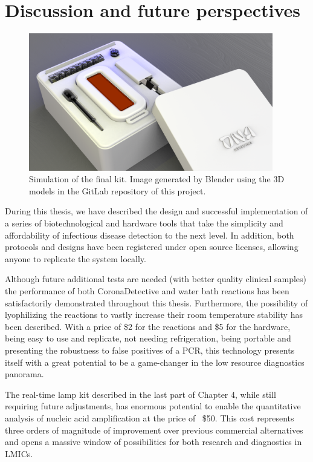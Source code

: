 
\chapter{Discussion and future perspectives}

\begin{figure}[b]
    \centering
    \includegraphics[width=0.95\textwidth]{figures/kit simulation.png}
    \caption{Simulation of the final kit. Image generated by Blender using the 3D models in the GitLab repository of this project\cite{francisco_javier_quero_lombardero_open_2021}.}
    \label{Final kit}
\end{figure}

During this thesis, we have described the design and successful implementation of a series of biotechnological and hardware tools that take the simplicity and affordability of infectious disease detection to the next level. In addition, both protocols and designs have been registered under open source licenses, allowing anyone to replicate the system locally.
    
Although future additional tests are needed (with better quality clinical samples) the performance of both CoronaDetective and water bath reactions has been satisfactorily demonstrated throughout this thesis. Furthermore, the possibility of lyophilizing the reactions to vastly increase their room temperature stability has been described. With a price of \$2 for the reactions and \$5 for the hardware, being easy to use and replicate, not needing refrigeration, being portable and presenting the robustness to false positives of a PCR, this technology presents itself with a great potential to be a game-changer in the low resource diagnostics panorama.
 
 \newpage   
The real-time lamp kit described in the last part of Chapter 4, while still requiring future adjustments, has enormous potential to enable the quantitative analysis of nucleic acid amplification at the price of ~\$50. This cost represents three orders of magnitude of improvement over previous commercial alternatives and opens a massive window of possibilities for both research and diagnostics in LMICs.


